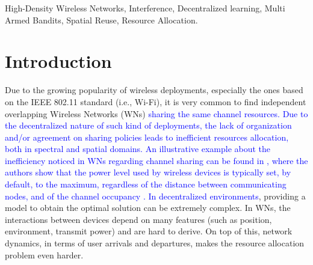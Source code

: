 \documentclass[preprint,12pt]{elsarticle}
\newcommand{\francesc}[1]{\textcolor{blue}{#1}}
\begin{document}
\begin{frontmatter}
\begin{keyword}
High-Density Wireless Networks, Interference, Decentralized learning, Multi Armed Bandits, Spatial Reuse, Resource Allocation.
\end{keyword}

\end{frontmatter}


\newpage

\section{Introduction}
\label{section:introduction}
Due to the growing popularity of wireless deployments, especially the ones based on the IEEE 802.11 standard (i.e., Wi-Fi), it is very common to find independent overlapping Wireless Networks (WNs) \francesc{sharing the same channel resources. Due to the decentralized nature of such kind of deployments, the lack of organization and/or agreement on sharing policies leads to inefficient resources allocation, both in spectral and spatial domains. An illustrative example about the inefficiency noticed in WNs regarding channel sharing can be found in \cite{akella2007self}, where the authors show that the power level used by wireless devices is typically set, by default, to the maximum, regardless of the distance between communicating nodes, and of the channel occupancy \cite{akella2007self}. In decentralized environments}, providing a model to obtain the optimal solution can be extremely complex. In WNs, the interactions between devices depend on many features (such as position, environment, transmit power) and are hard to derive. On top of this, network dynamics, in terms of user arrivals and departures, makes the resource allocation problem even harder. 
\end{document}

